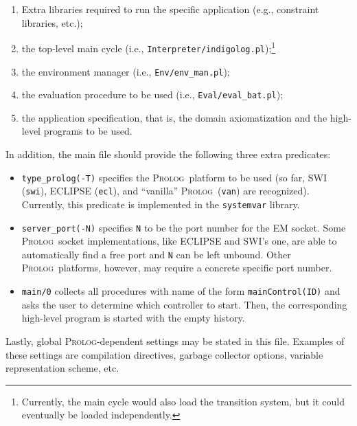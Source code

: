 \documentclass[11pt]{article}
\newcommand{\Prolog}{\mbox{\textsc{Prolog}}}
\begin{document}
\begin{enumerate}
\item Extra libraries required to run the specific application (e.g.,
constraint libraries, etc.);
  
\item the top-level main cycle (i.e.,
\texttt{Interpreter/indigolog.pl});\footnote{Currently, the main cycle would
also load the transition system, but it could eventually be loaded
independently.}

\item the environment manager  (i.e., \texttt{Env/env\_man.pl});

\item the evaluation procedure to be used (i.e., \texttt{Eval/eval\_bat.pl});
  
\item the application specification, that is, the domain axiomatization and
the high-level programs to be used.
\end{enumerate}


In addition, the main file should provide the following three extra
predicates:

\begin{itemize}
\item \texttt{type\_prolog(-T)} specifies the \Prolog\ platform to be used (so
  far, SWI (\texttt{swi}), ECLIPSE (\texttt{ecl}), and ``vanilla'' \Prolog\
  (\texttt{van}) are recognized). Currently, this predicate is implemented in
the \texttt{systemvar} library.
  
\item \texttt{server\_port(-N)} specifies \texttt{N} to be the port number for
the EM socket. Some \Prolog\ socket implementations, like ECLIPSE and SWI's one,
are able to automatically find a free port and \texttt{N} can be left
unbound. Other \Prolog\ platforms, however, may require a concrete specific port
number.

\item \texttt{main/0} collects all procedures with name of the form
\texttt{mainControl(ID)} and asks the user to determine which controller to
start. Then, the corresponding high-level program is started with the empty
history.
\end{itemize}

Lastly, global \Prolog-dependent settings may be stated in this file. Examples
of
these settings are compilation directives, garbage collector options, variable
representation scheme, etc.


\end{document}
